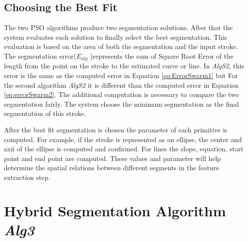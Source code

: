 \subsection{Choosing the Best Fit}
\label{sec:bestFit}
The two PSO algorithms produce two segmentation solutions. After that the system evaluates each solution to finally select the best segmentation. This evaluation is based on the area of both the segmentation and the input stroke. The segmentation error($E_{alg}$ )represents the sum of Square Root Error of the length from the point on the stroke to the estimated curve or line. In \textsl{AlgS2}, this error is the same as the computed error in Equation \ref{eq:ErrorSwarm1} but For the second algorithm \textsl{AlgS2} it is different than the computed error in Equation \ref{eq:errorSwarm2}. The additional computation is necessary to  compare the two segmentation fairly. The system choose the minimum segmentation as the final segmentation of this stroke. 


After the best fit segmentation is chosen the parameter of each primitive is computed. For example, if the stroke is represented as an ellipse, the center and axii of the ellipse is computed and confirmed. For lines the slope, equation, start point and end point are computed.  These values and parameter will help determine the spatial relations between different segments in the feature extraction step. 
  
\section{Hybrid Segmentation Algorithm \textsl{Alg3}}
\label{sec:BenchMarckAlgorithm}

